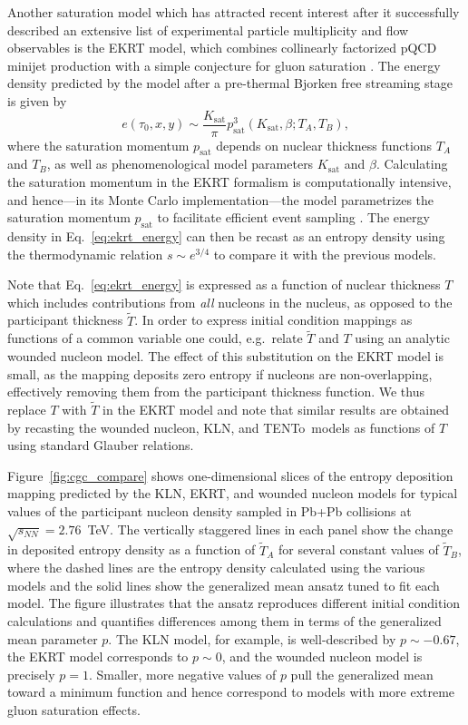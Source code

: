 \documentclass[aps,prc,reprint,amsmath,nofootinbib,noeprint]{revtex4-1}
\newcommand{\trento}{T\raisebox{-0.5ex}{R}ENTo}
\newcommand{\sqrts}{\sqrt{s_{NN}}}
\newcommand{\T}{\tilde{T}}
\begin{document}
Another saturation model which has attracted recent interest after it successfully described an extensive list of experimental particle multiplicity and flow observables \cite{Niemi:2015qia, Paatelainen:2013eea} is the EKRT model, which combines collinearly factorized pQCD minijet production with a simple conjecture for gluon saturation \cite{Eskola:1999fc, Eskola:2001bf}.
The energy density predicted by the model after a pre-thermal Bjorken free streaming stage is given by
\begin{equation}
  e(\tau_0, x, y) \sim \frac{K_\text{sat}}{\pi} p_\text{sat}^3(K_\text{sat}, \beta; T_A, T_B),
  \label{eq:ekrt_energy}
\end{equation}
where the saturation momentum $p_\text{sat}$ depends on nuclear thickness functions $T_A$ and $T_B$, as well as phenomenological model parameters $K_\text{sat}$ and $\beta$.
Calculating the saturation momentum in the EKRT formalism is computationally intensive, and hence---in its Monte Carlo implementation---the model parametrizes the saturation momentum $p_\text{sat}$ to facilitate efficient event sampling \cite{Niemi:2015qia}.
The energy density in Eq.~\eqref{eq:ekrt_energy} can then be recast as an entropy density using the thermodynamic relation ${s \sim e^{3/4}}$ to compare it with the previous models.

Note that Eq.~\eqref{eq:ekrt_energy} is expressed as a function of nuclear thickness $T$ which includes contributions from \emph{all} nucleons in the nucleus, as opposed to the participant thickness $\T$.
In order to express initial condition mappings as functions of a common variable one could, e.g.\ relate $\T$ and $T$ using an analytic wounded nucleon model.
The effect of this substitution on the EKRT model is small, as the mapping deposits zero entropy if nucleons are non-overlapping, effectively removing them from the participant thickness function.
We thus replace $T$ with $\T$ in the EKRT model and note that similar results are obtained by recasting the wounded nucleon, KLN, and \trento\ models as functions of $T$ using standard Glauber relations.

Figure~\ref{fig:cgc_compare} shows one-dimensional slices of the entropy deposition mapping predicted by the KLN, EKRT, and wounded nucleon models for typical values of the participant nucleon density sampled in Pb+Pb collisions at $\sqrts=2.76$~TeV.
The vertically staggered lines in each panel show the change in deposited entropy density as a function of $\T_A$ for several constant values of $\T_B$, where the dashed lines are the entropy density calculated using the various models and the solid lines show the generalized mean ansatz tuned to fit each model.
The figure illustrates that the ansatz reproduces different initial condition calculations and quantifies differences among them in terms of the generalized mean parameter $p$.
The KLN model, for example, is well-described by $p\sim-0.67$, the EKRT model corresponds to $p \sim 0$, and the wounded nucleon model is precisely $p=1$.
Smaller, more negative values of $p$ pull the generalized mean toward a minimum function and hence correspond to models with more extreme gluon saturation effects.
\end{document}
